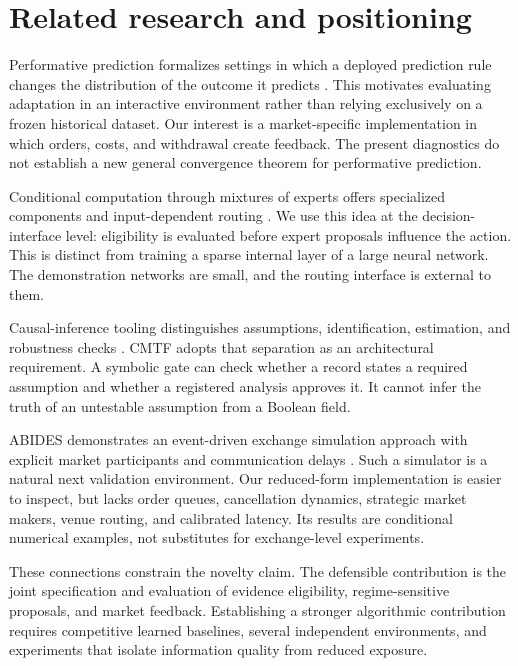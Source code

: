 \section{Related research and positioning}
Performative prediction formalizes settings in which a deployed prediction rule changes the distribution of the outcome it predicts \cite{perdomo}. This motivates evaluating adaptation in an interactive environment rather than relying exclusively on a frozen historical dataset. Our interest is a market-specific implementation in which orders, costs, and withdrawal create feedback. The present diagnostics do not establish a new general convergence theorem for performative prediction.

Conditional computation through mixtures of experts offers specialized components and input-dependent routing \cite{shazeer}. We use this idea at the decision-interface level: eligibility is evaluated before expert proposals influence the action. This is distinct from training a sparse internal layer of a large neural network. The demonstration networks are small, and the routing interface is external to them.

Causal-inference tooling distinguishes assumptions, identification, estimation, and robustness checks \cite{dowhy}. CMTF adopts that separation as an architectural requirement. A symbolic gate can check whether a record states a required assumption and whether a registered analysis approves it. It cannot infer the truth of an untestable assumption from a Boolean field.

ABIDES demonstrates an event-driven exchange simulation approach with explicit market participants and communication delays \cite{abides}. Such a simulator is a natural next validation environment. Our reduced-form implementation is easier to inspect, but lacks order queues, cancellation dynamics, strategic market makers, venue routing, and calibrated latency. Its results are conditional numerical examples, not substitutes for exchange-level experiments.



These connections constrain the novelty claim. The defensible contribution is the joint specification and evaluation of evidence eligibility, regime-sensitive proposals, and market feedback. Establishing a stronger algorithmic contribution requires competitive learned baselines, several independent environments, and experiments that isolate information quality from reduced exposure.

